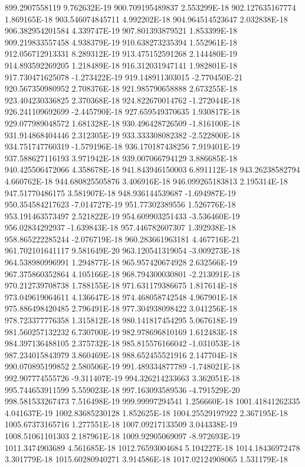 899.2907558119  9.762632E-19
900.709195489837  2.553299E-18
902.127635167774  1.869165E-18
903.546074845711  4.992202E-18
904.964514523647  2.032838E-18
906.382954201584  4.339747E-19
907.801393879521  1.853399E-18
909.219833557458  4.938379E-19
910.638273235394  1.552961E-18
912.056712913331  8.289312E-19
913.475152591268  2.144480E-19
914.893592269205  1.218489E-18
916.312031947141  1.982801E-18
917.730471625078  -1.273422E-19
919.148911303015  -2.770450E-21
920.567350980952  2.708376E-18
921.985790658888  2.673255E-18
923.404230336825  2.370368E-18
924.822670014762  -1.272044E-18
926.241109692699  -2.445790E-18
927.659549370635  1.930817E-18
929.077989048572  1.681328E-18
930.496428726509  -1.816100E-18
931.914868404446  2.312305E-19
933.333308082382  -2.522800E-18
934.751747760319  -1.579196E-18
936.170187438256  7.919401E-19
937.588627116193  3.971942E-18
939.007066794129  3.886685E-18
940.425506472066  4.358678E-18
941.843946150003  6.891112E-18
943.26238582794  4.660762E-18
944.680825505876  3.406916E-18
946.099265183813  2.195314E-18
947.51770486175  3.581907E-18
948.936144539687  -1.694987E-19
950.354584217623  -7.014727E-19
951.77302389556  1.526776E-18
953.191463573497  2.521822E-19
954.609903251433  -3.536460E-19
956.02834292937  -1.639843E-18
957.446782607307  1.392938E-18
958.865222285244  -2.076719E-18
960.283661963181  4.467716E-21
961.702101641117  9.581649E-20
963.120541319054  -3.009273E-18
964.538980996991  1.294877E-18
965.957420674928  2.632566E-19
967.375860352864  4.105166E-18
968.794300030801  -2.213091E-18
970.212739708738  1.788155E-18
971.631179386675  1.817614E-18
973.049619064611  4.136647E-18
974.468058742548  4.967901E-18
975.886498420485  2.796491E-18
977.304938098422  3.041256E-18
978.723377776358  1.315812E-18
980.141817454295  5.067618E-19
981.560257132232  6.730700E-19
982.978696810169  1.612483E-18
984.397136488105  2.375732E-18
985.815576166042  -1.031053E-18
987.234015843979  3.860469E-18
988.652455521916  2.147704E-18
990.070895199852  2.580506E-19
991.489334877789  -1.748021E-18
992.907774555726  -9.311407E-19
994.326214233663  3.362051E-18
995.744653911599  5.559023E-18
997.163093589536  -4.791529E-20
998.581533267473  7.516498E-19
999.99997294541  1.256660E-18
1001.41841262335  4.041637E-19
1002.83685230128  1.852625E-18
1004.25529197922  2.367195E-18
1005.67373165716  1.277551E-18
1007.09217133509  3.044338E-19
1008.51061101303  2.187961E-18
1009.92905069097  -8.972693E-19
1011.3474903689  4.561685E-18
1012.76593004684  5.104227E-18
1014.18436972478  3.301779E-18
1015.60280940271  3.914586E-18
1017.02124908065  1.531179E-18
